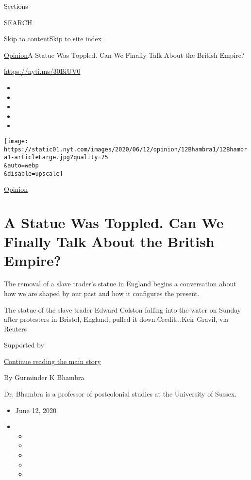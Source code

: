 Sections

SEARCH

\protect\hyperlink{site-content}{Skip to
content}\protect\hyperlink{site-index}{Skip to site index}

\href{/section/opinion}{Opinion}\textbar{}A Statue Was Toppled. Can We
Finally Talk About the British Empire?

\url{https://nyti.ms/30BiUV0}

\begin{itemize}
\item
\item
\item
\item
\item
\end{itemize}

\texttt{[image: https://static01.nyt.com/images/2020/06/12/opinion/12Bhambra1/12Bhambra1-articleLarge.jpg?quality=75\\\&auto=webp\\\&disable=upscale]}

\href{/section/opinion}{Opinion}

\hypertarget{a-statue-was-toppled-can-we-finally-talk-about-the-british-empire}{%
\section{A Statue Was Toppled. Can We Finally Talk About the British
Empire?}\label{a-statue-was-toppled-can-we-finally-talk-about-the-british-empire}}

The removal of a slave trader's statue in England begins a conversation
about how we are shaped by our past and how it configures the present.

The statue of the slave trader Edward Colston falling into the water on
Sunday after protesters in Bristol, England, pulled it
down.Credit...Keir Gravil, via Reuters

Supported by

\protect\hyperlink{after-sponsor}{Continue reading the main story}

By Gurminder K Bhambra

Dr. Bhambra is a professor of postcolonial studies at the University of
Sussex.

\begin{itemize}
\item
  June 12, 2020
\item
  \begin{itemize}
  \item
  \item
  \item
  \item
  \item
  \end{itemize}
\end{itemize}

